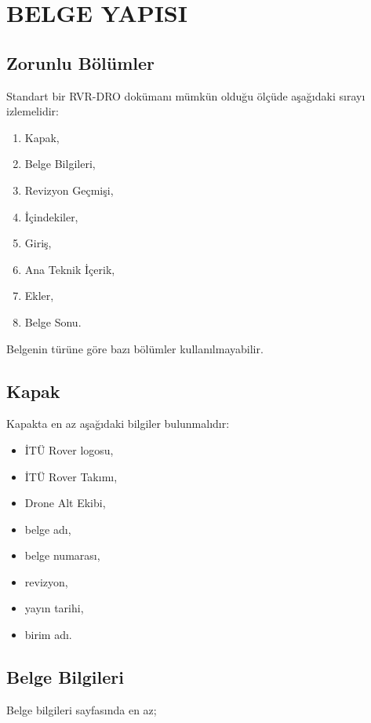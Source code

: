 \documentclass[11pt,a4paper]{article}
\begin{document}
\newpage

\section{BELGE YAPISI}

\subsection{Zorunlu Bölümler}

Standart bir RVR-DRO dokümanı mümkün olduğu ölçüde aşağıdaki sırayı
izlemelidir:

\begin{enumerate}
    \item Kapak,
    \item Belge Bilgileri,
    \item Revizyon Geçmişi,
    \item İçindekiler,
    \item Giriş,
    \item Ana Teknik İçerik,
    \item Ekler,
    \item Belge Sonu.
\end{enumerate}

Belgenin türüne göre bazı bölümler kullanılmayabilir.

\subsection{Kapak}

Kapakta en az aşağıdaki bilgiler bulunmalıdır:

\begin{itemize}
    \item İTÜ Rover logosu,
    \item İTÜ Rover Takımı,
    \item Drone Alt Ekibi,
    \item belge adı,
    \item belge numarası,
    \item revizyon,
    \item yayın tarihi,
    \item birim adı.
\end{itemize}

\subsection{Belge Bilgileri}

Belge bilgileri sayfasında en az;
\end{document}

